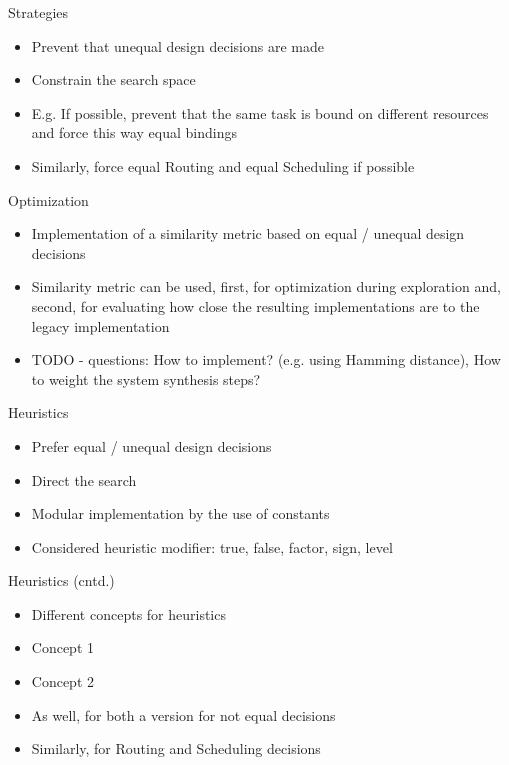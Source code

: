\documentclass[11pt]{beamer}
\begin{document}
\begin{frame}{Strategies}
	\begin{itemize}
		\item Prevent that unequal design decisions are made
		\item Constrain the search space
		\item E.g. If possible, prevent that the same task is bound on different resources and force this way equal bindings 
		
		\pause
		\item Similarly, force equal Routing and equal Scheduling if possible
	\end{itemize}
\end{frame}

\begin{frame}{Optimization}
	\begin{itemize}
		\item Implementation of a similarity metric based on equal / unequal design decisions
		\item Similarity metric can be used, first, for optimization during exploration and, second, for evaluating how close the resulting implementations are to the legacy implementation
		\newline
		\pause 
		\item TODO - questions: How to implement? (e.g. using Hamming distance), How to weight the system synthesis steps?
	\end{itemize}
\end{frame}

\begin{frame}{Heuristics}
	\begin{itemize}
		\item Prefer equal / unequal design decisions
		\item Direct the search
		\pause
		\item Modular implementation by the use of constants
		
		\pause
		
		\pause
		\item Considered heuristic modifier: true, false, factor, sign, level
	\end{itemize}
\end{frame}

\begin{frame}{Heuristics (cntd.)}
	\begin{itemize}
		\item Different concepts for heuristics
		\item Concept 1
		
		\pause
		\item Concept 2
		
		\pause
		\item As well, for both a version for not equal decisions
		\item Similarly, for Routing and Scheduling decisions
	\end{itemize}
\end{frame}
\end{document}
